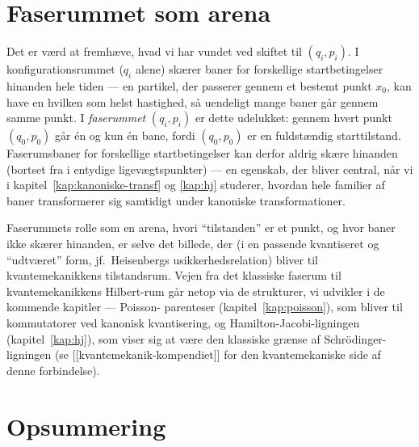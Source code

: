 \section{Faserummet som arena}

Det er værd at fremhæve, hvad vi har vundet ved skiftet til
$(q_i,p_i)$. I konfigurationsrummet ($q_i$ alene) skærer baner for
forskellige startbetingelser hinanden hele tiden — en partikel, der
passerer gennem et bestemt punkt $x_0$, kan have en hvilken som helst
hastighed, så uendeligt mange baner går gennem samme punkt. I
\emph{faserummet} $(q_i,p_i)$ er dette udelukket: gennem hvert punkt
$(q_0,p_0)$ går \'en og kun \'en bane, fordi $(q_0,p_0)$ er en
fuldstændig starttilstand. Faserumsbaner for forskellige startbetingelser
kan derfor aldrig skære hinanden (bortset fra i entydige ligevægtspunkter)
— en egenskab, der bliver central, når vi i kapitel~\ref{kap:kanoniske-transf}
og \ref{kap:hj} studerer, hvordan hele familier af baner transformerer
sig samtidigt under kanoniske transformationer.

\begin{bemaerkning}
Faserummets rolle som en arena, hvori ``tilstanden'' er et punkt, og hvor
baner ikke skærer hinanden, er selve det billede, der (i en passende
kvantiseret og ``udtværet'' form, jf.\ Heisenbergs
usikkerhedsrelation) bliver til kvantemekanikkens tilstandsrum. Vejen
fra det klassiske faserum til kvantemekanikkens Hilbert-rum går netop
via de strukturer, vi udvikler i de kommende kapitler — Poisson-
parenteser (kapitel~\ref{kap:poisson}), som bliver til kommutatorer ved
kanonisk kvantisering, og Hamilton-Jacobi-ligningen
(kapitel~\ref{kap:hj}), som viser sig at være den klassiske grænse af
Schrödinger-ligningen (se [[kvantemekanik-kompendiet]] for den
kvantemekaniske side af denne forbindelse).
\end{bemaerkning}

\section{Opsummering}


